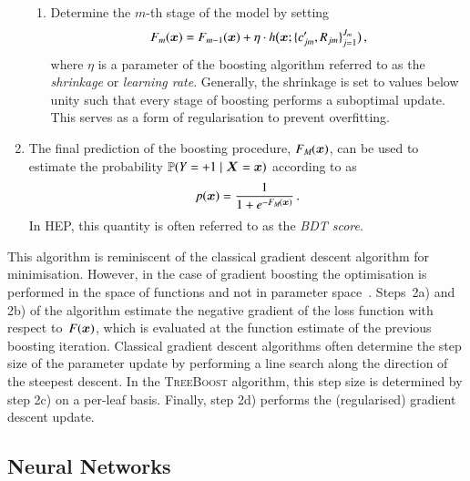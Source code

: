 \begin{enumerate}[itemsep=2pt]
\begin{enumerate}[itemsep=2pt]
  \item Determine the $m$-th stage of the model by setting
    \begin{align*}
      F_m(\bm{x}) = F_{m - 1}(\bm{x})
      + \eta \cdot h\bigl( \bm{x}; \{c_{jm}^\prime, R_{jm}\}_{j=1}^{J_{m}} \bigr)
      \,\text{,}
    \end{align*}
    where $\eta$ is a parameter of the boosting algorithm referred to as the
    \emph{shrinkage} or \emph{learning rate}. Generally, the shrinkage is set to
    values below unity such that every stage of boosting performs a suboptimal
    update. This serves as a form of regularisation to prevent overfitting.

  \end{enumerate}

\item The final prediction of the boosting procedure,
  $F_{M\hspace{-0.07em}}(\bm{x})$, can be used to estimate the probability
  $\mathbb{P}(Y = +1 \mid \bm{X} = \bm{x})$ according to
   as
  \begin{align*}
    p(\bm{x}) = \frac{1}{1 + e^{-F_{M\hspace{-0.07em}}(\bm{x})}} \,\text{.}
  \end{align*}
  In HEP, this quantity is often referred to as the \emph{BDT score}.

\end{enumerate}
This algorithm is reminiscent of the classical gradient descent algorithm for
minimisation. However, in the case of gradient boosting the optimisation is
performed in the space of functions and not in parameter
space~\cite{Friedman:2001wbq}. Steps~2a) and 2b) of the algorithm estimate the
negative gradient of the loss function with respect to~$F(\bm{x})$, which is
evaluated at the function estimate of the previous boosting iteration. Classical
gradient descent algorithms often determine the step size of the parameter
update by performing a line search along the direction of the steepest descent. In
the \textsc{TreeBoost} algorithm, this step size is determined by step 2c) on a
per-leaf basis.
Finally, step 2d) performs the (regularised) gradient descent update.


\subsection{Neural Networks}%
\label{sec:neural_networks}

